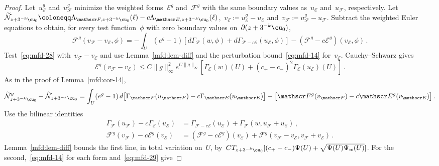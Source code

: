 \documentclass[11pt]{amsart}
\begin{document}
\begin{proof}
Let~$u_{\mathscr E}^g$ and~$u_{\mathscr F}^g$ minimize the weighted forms~$\mathscr E^g$ and~$\mathscr F^g$ with the same boundary values as~$u_{\mathscr E}$ and~$u_{\mathscr F}$, respectively. Let~$\widetilde{\mathcal N}_{z+3^{-k}\cu_0}\coloneqq\Lambda_{\mathscr F,z+3^{-k}\cu_0}(\ell)-c\Lambda_{\mathscr E,z+3^{-k}\cu_0}(\ell)$,~$v_{\mathscr E}\coloneqq u_{\mathscr E}^g-u_{\mathscr E}$ and~$v_{\mathscr F}\coloneqq u_{\mathscr F}^g-u_{\mathscr F}$. Subtract the weighted Euler equations to obtain, for every test function~$\phi$ with zero boundary values on~$\partial(z+3^{-k}\cu_0)$,
\begin{equation}
	\mathscr F^g(v_{\mathscr F}-v_{\mathscr E},\phi)=-\int_U(e^g-1)
	[d\Gamma_{\mathscr F}(w,\phi)+d\Gamma_{\mathscr F-c\mathscr E}(u_{\mathscr E},\phi)]-(\mathscr F^g-c\mathscr E^g)(v_{\mathscr E},\phi)\,.
	\label{eq:mfd-28}
\end{equation}
Test~\eqref{eq:mfd-28} with~$v_{\mathscr F}-v_{\mathscr E}$ and use Lemma~\ref{mfd:lem-diff} and the perturbation bound~\eqref{eq:mfd-14} for~$v_{\mathscr E}$. Cauchy--Schwarz gives
\begin{equation}
	\mathscr E^g(v_{\mathscr F}-v_{\mathscr E})\leq C\|g\|_\infty^2e^{C\|g\|_\infty}
	[\Gamma_{\mathscr E}(w)(U)+(c_+-c_-)^2\Gamma_{\mathscr E}(u_{\mathscr E})(U)]\,.
	\label{eq:mfd-29}
\end{equation}
As in the proof of Lemma~\ref{mfd:cor-14},
\begin{equation*}
	\widetilde{\mathcal N}_{z+3^{-k}\cu_0}^g-\widetilde{\mathcal N}_{z+3^{-k}\cu_0}
	=\int_U(e^g-1)\,d\bigl[\Gamma_{\mathscr F}(u_{\mathscr F})-c\Gamma_{\mathscr E}(u_{\mathscr E})\bigr]
	-\bigl[\mathscr F^g(v_{\mathscr F})-c\mathscr E^g(v_{\mathscr E})\bigr]\,.
\end{equation*}
Use the bilinear identities
\begin{align*}
	\Gamma_{\mathscr F}(u_{\mathscr F})-c\Gamma_{\mathscr E}(u_{\mathscr E})
	&=\Gamma_{\mathscr F-c\mathscr E}(u_{\mathscr E})+\Gamma_{\mathscr F}(w,u_{\mathscr F}+u_{\mathscr E})\,,\\
	\mathscr F^g(v_{\mathscr F})-c\mathscr E^g(v_{\mathscr E})
	&=(\mathscr F^g-c\mathscr E^g)(v_{\mathscr E})+\mathscr F^g(v_{\mathscr F}-v_{\mathscr E},v_{\mathscr F}+v_{\mathscr E})\,.
\end{align*}
Lemma~\ref{mfd:lem-diff} bounds the first line, in total variation on~$U$, by~$CT_{z+3^{-k}\cu_0}[(c_+-c_-)\Psi(U)+\sqrt{\Psi(U)\Psi_w(U)}]$. For the second,~\eqref{eq:mfd-14} for each form and~\eqref{eq:mfd-29} give

\end{proof}
\end{document}
